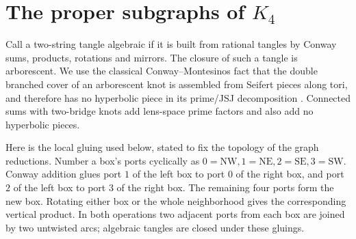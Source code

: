 \documentclass[11pt]{article}
\begin{document}
\section{The proper subgraphs of \texorpdfstring{$K_4$}{K4}}

Call a two-string tangle algebraic if it is built from rational tangles
by Conway sums, products, rotations and mirrors.
The closure of such a tangle is arborescent.
We use the classical Conway--Montesinos fact that the double branched
cover of an arborescent knot is assembled from Seifert pieces along
tori, and therefore has no hyperbolic piece in its prime/JSJ
decomposition \cite[Introduction, pp.~vi--vii]{bs}.
Connected sums with two-bridge knots add lens-space prime factors and
also add no hyperbolic pieces.

Here is the local gluing used below, stated to fix the topology of the
graph reductions. Number a box's ports cyclically as
$0=\mathrm{NW},1=\mathrm{NE},2=\mathrm{SE},3=\mathrm{SW}$.
Conway addition glues port $1$ of the left box to port $0$ of the right
box, and port $2$ of the left box to port $3$ of the right box.
The remaining four ports form the new box.
Rotating either box or the whole neighborhood gives the corresponding
vertical product. In both operations two adjacent ports from each box
are joined by two untwisted arcs; algebraic tangles are closed under
these gluings.
\end{document}
